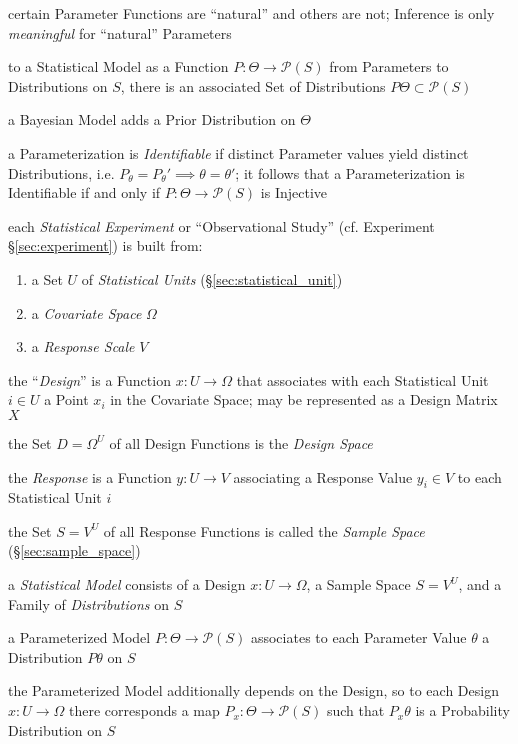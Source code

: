 certain Parameter Functions are ``natural'' and others are not; Inference is
only \emph{meaningful} for ``natural'' Parameters

to a Statistical Model as a Function $P : \Theta \to \mathcal{P}(S)$
from Parameters to Distributions on $S$, there is an associated Set of
Distributions $P \Theta \subset \mathcal{P}(S)$

a Bayesian Model adds a Prior Distribution on $\Theta$

a Parameterization is \emph{Identifiable} if distinct Parameter values yield
distinct Distributions, i.e. $P_\theta = P_\theta' \implies \theta = \theta'$;
it follows that a Parameterization is Identifiable if and only if
$P : \Theta \to \mathcal{P}(S)$ is Injective

each \emph{Statistical Experiment} or ``Observational Study'' (cf. Experiment
\S\ref{sec:experiment}) is built from:
\begin{enumerate}
  \item a Set $U$ of \emph{Statistical Units} (\S\ref{sec:statistical_unit})
  \item a \emph{Covariate Space} $\Omega$
  \item a \emph{Response Scale} $V$
\end{enumerate}

the ``\emph{Design}'' is a Function $x : U \to \Omega$ that associates with each
Statistical Unit $i \in U$ a Point $x_i$ in the Covariate Space; may be
represented as a Design Matrix $X$

the Set $D = \Omega^U$ of all Design Functions is the \emph{Design Space}

the \emph{Response} is a Function $y : U \to V$ associating a Response Value
$y_i \in V$ to each Statistical Unit $i$

the Set $S = V^U$ of all Response Functions is called the \emph{Sample Space}
(\S\ref{sec:sample_space})

a \emph{Statistical Model} consists of a Design $x : U \to \Omega$, a Sample
Space $S = V^U$, and a Family of \emph{Distributions} on $S$

a Parameterized Model $P : \Theta \to \mathcal{P}(S)$ associates to each
Parameter Value $\theta$ a Distribution $P\theta$ on $S$

the Parameterized Model additionally depends on the Design, so to each Design
$x : U \to \Omega$ there corresponds a map $P_x : \Theta \to \mathcal{P}(S)$
such that $P_x\theta$ is a Probability Distribution on $S$

